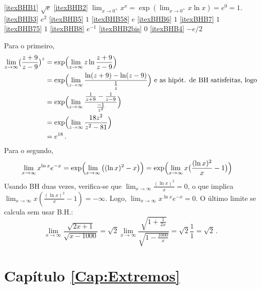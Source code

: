 \begin{Solution}{6.51}
\eqref{itexBHB1} $\sqrt{e}$
\eqref{itexBHB2} $\lim_{x\to 0^+}x^x=\exp(\lim_{x\to 0^+}x\ln x)=e^0=1$.
\eqref{itexBHB3} $e^2$
\eqref{itexBHB5} $1$
\eqref{itexBHB58} $e$
\eqref{itexBHB6} $1$
\eqref{itexBHB7} $1$
\eqref{itexBHB75} $1$
\eqref{itexBHB8} $e^{-1}$
\eqref{itexBHB2bis} $0$
\eqref{itexBHB4} $-e/2$
\end{Solution}
\begin{Solution}{6.52}
 Para o primeiro,
\begin{align*}
 \lim_{z\to \infty}\bigl(\frac{z+9}{z-9}\bigr)^z&=\exp \Bigl(\lim_{z\to \infty}
z \ln \frac{z+9}{z-9}\Bigr)\\
&=\exp \Bigl(\lim_{z\to \infty} \frac{\ln (z+9)-\ln
(z-9)}{\frac{1}{z}}\Bigr)\text{ e as hipót. de BH satisfeitas, logo}\\
&=\exp \Bigl(\lim_{z\to \infty}
\frac{\frac{1}{z+9}-\frac{1}{z-9}}{\frac{-1}{z^2}}\Bigr)\\
&=\exp \Bigl(\lim_{z\to \infty} \frac{18 z^2}{z^2-81}\Bigr)\\
&=e^{18}\,.
\end{align*}
Para o segundo,
\begin{align*}
 \lim_{x\to \infty}x^{\ln x}e^{-x}&=\exp \Bigl(\lim_{x\to \infty} \big((\ln
x)^2-x \big)\Bigr)
=\exp \Bigl(\lim_{x\to \infty} x\big(\frac{(\ln x)^2}{x}-1
\big)\Bigr)
\end{align*}
Usando BH duas vezes, verifica-se que $\lim_{x\to \infty}\frac{(\ln
x)^2}{x}=0$,
o que implica $\lim_{x\to \infty} x(\frac{(\ln
x)^2}{x}-1)=-\infty$.
Logo, $\lim_{x\to \infty}x^{\ln x}e^{-x}=0$.
O último limite se calcula sem usar B.H.:
$$\lim_{x\to \infty}\frac{\sqrt{2x+1}}{\sqrt{x-1000}}=\sqrt{2}\lim_{x\to
\infty}\frac{\sqrt{1+\frac{1}{2x}}}{\sqrt{1-\frac{1000}{x}}}=\sqrt{2}\frac{1}{1}
=\sqrt{2}\,.$$
\end{Solution}
\protect \section *{Capítulo \ref {Cap:Extremos}}
